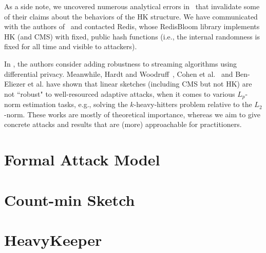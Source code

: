 As a side note, we uncovered numerous analytical errors in~\cite{yang2019heavykeeper} that invalidate some of their claims about the behaviors of the HK structure.  We have communicated with the authors of~\cite{yang2019heavykeeper} and contacted Redis, whose RedisBloom library implements HK (and CMS) with fixed, public hash functions (i.e., the internal randomness is fixed for all time and visible to attackers).

In \cite{HassidimKMMS20}, the authors consider adding robustness to streaming algorithms using differential privacy.
Meanwhile, Hardt and Woodruff~\cite{hardt2013}, Cohen et al.~\cite{cohen2022robust} and Ben-Eliezer et al.\cite{BenEliezer2022} have shown that linear sketches (including CMS but not HK) are not ``robust" to well-resourced adaptive attacks, when it comes to various $L_p$-norm estimation tasks, e.g., solving the $k$-heavy-hitters problem relative to the $L_2$-norm.  
These works are mostly of theoretical importance, whereas we aim to give concrete  attacks and results that are (more) approachable for practitioners.



\section{Formal Attack Model}\label{sec:adv}



\section{Count-min Sketch}\label{sec:cms}
   
   

\section{HeavyKeeper}\label{sec:hk}
   
   

